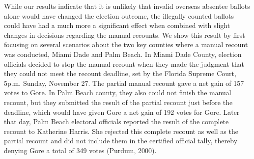 \documentclass[11pt,titlepage]{article}
\begin{document}
While our results indicate that it is unlikely that invalid overseas
absentee ballots alone would have changed the election outcome, the
illegally counted ballots could have had a much more a significant
effect when combined with slight changes in decisions regarding the
manual recounts.  We show this result by first focusing on several
scenarios about the two key counties where a manual recount was
conducted, Miami Dade and Palm Beach. In Miami Dade County, election
officials decided to stop the manual recount when they made the
judgment that they could not meet the recount deadline, set by the
Florida Supreme Court, 5p.m.  Sunday, November 27.  The partial manual
recount gave a net gain of 157 votes to Gore. In Palm Beach county,
they also could not finish the manual recount, but they submitted the
result of the partial recount just before the deadline, which would
have given Gore a net gain of 192 votes for Gore. Later that day, Palm
Beach electoral officials reported the result of the complete recount
to Katherine Harris.  She rejected this complete recount as well as
the partial recount and did not include them in the certified official
tally, thereby denying Gore a total of 349 votes
\nocite{purd:00}(Purdum, 2000).
\end{document}
